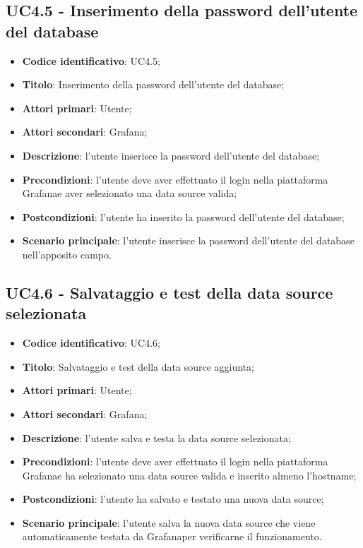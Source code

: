     \subsection{UC4.5 - Inserimento della password dell'utente del database}
        \begin{itemize}
            \item \textbf{Codice identificativo}: UC4.5;
            \item \textbf{Titolo}: Inserimento della password dell'utente del database;
            \item \textbf{Attori primari}: Utente;
            \item \textbf{Attori secondari}: Grafana\glo;
            \item \textbf{Descrizione}: l'utente inserisce la password dell'utente del database;
            \item \textbf{Precondizioni}: l'utente deve aver effettuato il login nella piattaforma Grafana\glo e aver selezionato una                                  data source valida;
            \item \textbf{Postcondizioni}: l'utente ha inserito la password dell'utente del database;
            \item \textbf{Scenario principale}: l'utente inserisce la password dell'utente del database nell'apposito campo.
        \end{itemize}
    \subsection{UC4.6 - Salvataggio e test della data source selezionata}
        \begin{itemize}
            \item \textbf{Codice identificativo}: UC4.6;
            \item \textbf{Titolo}: Salvataggio e test della data source aggiunta;
            \item \textbf{Attori primari}: Utente;
            \item \textbf{Attori secondari}: Grafana\glo;
            \item \textbf{Descrizione}: l'utente salva e testa la data source selezionata;
            \item \textbf{Precondizioni}: l'utente deve aver effettuato il login nella piattaforma Grafana\glo e ha selezionato una data                               source valida e inserito almeno l'hostname;
            \item \textbf{Postcondizioni}: l'utente ha salvato e testato una nuova data source;
            \item \textbf{Scenario principale}: l'utente salva la nuova data source che viene automaticamente testata da Grafana\glosp                                       per verificarne il funzionamento.
        \end{itemize}
